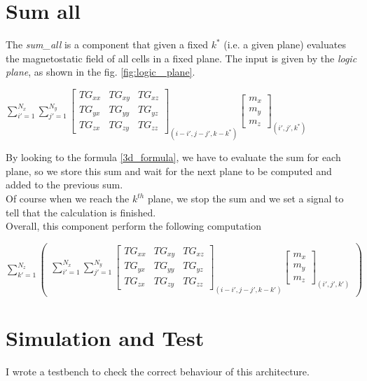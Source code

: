     \section{Sum all}
    The \textit{sum\_all} is a component that given a fixed $ k^* $ (i.e. a given plane) evaluates the magnetostatic field of all cells in a fixed plane.
    The input is given by the \textit{logic plane}, as shown in the fig. \ref{fig:logic_ plane}.
    \begin{center}
    	$ \sum\limits_{i'=1}^{N_{x}} \sum\limits_{j'=1}^{N_{y}}\begin{bmatrix}
    	TG_{xx} & TG_{xy} & TG_{xz}\\
    	TG_{yx} & TG_{yy}& TG_{yz}    	\\
    	TG_{zx}&TG_{zy} & TG_{zz}  
    	\end{bmatrix}_{(i-i',j-j',k-k^*)}\begin{bmatrix}
    	m_{x}\\
    	m_{y}\\
    	m_{z}\end{bmatrix}_{(i',j',k^*)} $
    \end{center}
    By looking to the formula \ref{3d_formula}, we have to evaluate the sum for each plane, so we store this sum and wait for the next plane to be computed and added to the previous sum.\\
    Of course when we reach the $ k^{th} $ plane, we stop the sum and we set a signal to tell that the calculation is finished.\\
    Overall, this component perform the following computation\\
    \begin{center}
    	$ \sum\limits_{k'=1}^{N_{z}}\begin{pmatrix}
    	\sum\limits_{i'=1}^{N_{x}} \sum\limits_{j'=1}^{N_{y}}\begin{bmatrix}
    	TG_{xx} & TG_{xy} & TG_{xz}\\
    	TG_{yx} & TG_{yy}& TG_{yz}    	\\
    	TG_{zx}&TG_{zy} & TG_{zz}  
    	\end{bmatrix}_{(i-i',j-j',k-k')}\begin{bmatrix}
    	m_{x}\\
    	m_{y}\\
    	m_{z}\end{bmatrix}_{(i',j',k')}
    	\end{pmatrix} $
    \end{center}
    \bigskip
\section{Simulation and Test}
I wrote a testbench to check the correct behaviour of this architecture.
